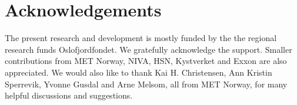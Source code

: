 \documentclass[12pt,a4paper,english]{article}
\begin{document}


\clearpage
\section*{\hspace{17mm}Acknowledgements}
The present research and development is mostly funded by the the regional research funds Oslofjordfondet. We gratefully acknowledge the support. Smaller contributions from MET Norway, NIVA, HSN, Kystverket and Exxon are also appreciated. We would also like to thank Kai H. Christensen, Ann Kristin Sperrevik, Yvonne Gusdal and Arne Melsom, all from MET Norway, for many helpful discussions and suggestions.   




\clearpage
\pagebreak



\clearpage
\pagebreak
 
\end{document}
